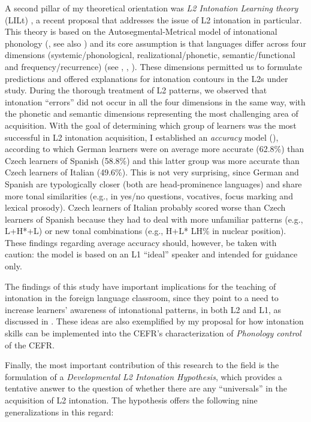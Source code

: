 A second pillar of my theoretical orientation was \textit{L2 Intonation Learning theory} (LILt) \citep{Mennen2015}, a recent proposal that addresses the issue of L2 intonation in particular. This theory is based on the Autosegmental-Metrical model of intonational phonology (\citealt{Pierrehumbert1980}, see also ) and its core assumption is that languages differ across four dimensions (systemic/phonological, realizational/phonetic, semantic/functional and frequency/recurrence) (see , , ). These dimensions permitted us to formulate predictions and offered explanations for intonation contours in the L2s under study. During the thorough treatment of L2 patterns, we observed that intonation ``errors'' did not occur in all the four dimensions in the same way, with the phonetic and semantic dimensions representing the most challenging area of acquisition. With the goal of determining which group of learners was the most successful in L2 intonation acquisition, I established an \textit{accuracy} model (), according to which German learners were on average more accurate (62.8\%) than Czech learners of Spanish (58.8\%) and this latter group was more accurate than Czech learners of Italian (49.6\%). This is not very surprising, since German and Spanish are typologically closer (both are head-prominence languages) and share more tonal similarities (e.g., in yes/no questions, vocatives, focus marking and lexical prosody). Czech learners of Italian probably scored worse than Czech learners of Spanish because they had to deal with more unfamiliar patterns (e.g., L+H*+L) or new tonal combinations (e.g., H+L* LH\% in nuclear position). These findings regarding average accuracy should, however, be taken with caution: the model is based on an L1 “ideal” speaker and intended for guidance only.



The findings of this study have important implications for the teaching of intonation in the foreign language classroom, since they point to a need to increase learners’ awareness of intonational patterns, in both L2 and L1, as discussed in . These ideas are also exemplified by my proposal for how intonation skills can be implemented into the CEFR’s characterization of \textit{Phonology control} of the CEFR.



Finally, the most important contribution of this research to the field is the formulation of a \textit{Developmental L2 Intonation Hypothesis}, which provides a tentative answer to the question of whether there are any “universals” in the acquisition of L2 intonation. The hypothesis offers the following nine generalizations in this regard:


